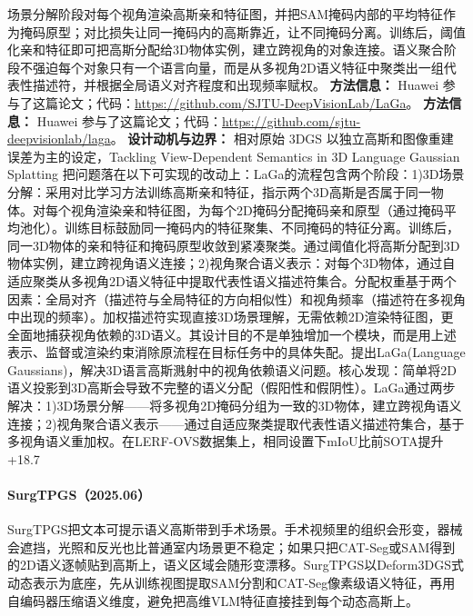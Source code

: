 场景分解阶段对每个视角渲染高斯亲和特征图，并把SAM掩码内部的平均特征作为掩码原型；对比损失让同一掩码内的高斯靠近，让不同掩码分离。训练后，阈值化亲和特征即可把高斯分配给3D物体实例，建立跨视角的对象连接。语义聚合阶段不强迫每个对象只有一个语言向量，而是从多视角2D语义特征中聚类出一组代表性描述符，并根据全局语义对齐程度和出现频率赋权。
\textbf{方法信息：} Huawei 参与了这篇论文；代码：\url{https://github.com/SJTU-DeepVisionLab/LaGa}。
\textbf{方法信息：} Huawei 参与了这篇论文；代码：\url{https://github.com/sjtu-deepvisionlab/laga}。
\textbf{设计动机与边界：} 相对原始 3DGS 以独立高斯和图像重建误差为主的设定，Tackling View-Dependent Semantics in 3D Language Gaussian Splatting 把问题落在以下可实现的改动上：LaGa的流程包含两个阶段：1)3D场景分解：采用对比学习方法训练高斯亲和特征，指示两个3D高斯是否属于同一物体。对每个视角渲染亲和特征图，为每个2D掩码分配掩码亲和原型（通过掩码平均池化）。训练目标鼓励同一掩码内的特征聚集、不同掩码的特征分离。训练后，同一3D物体的亲和特征和掩码原型收敛到紧凑聚类。通过阈值化将高斯分配到3D物体实例，建立跨视角语义连接；2)视角聚合语义表示：对每个3D物体，通过自适应聚类从多视角2D语义特征中提取代表性语义描述符集合。分配权重基于两个因素：全局对齐（描述符与全局特征的方向相似性）和视角频率（描述符在多视角中出现的频率）。加权描述符实现直接3D场景理解，无需依赖2D渲染特征图，更全面地捕获视角依赖的3D语义。其设计目的不是单独增加一个模块，而是用上述表示、监督或渲染约束消除原流程在目标任务中的具体失配。提出LaGa(Language Gaussians)，解决3D语言高斯溅射中的视角依赖语义问题。核心发现：简单将2D语义投影到3D高斯会导致不完整的语义分配（假阳性和假阴性）。LaGa通过两步解决：1)3D场景分解——将多视角2D掩码分组为一致的3D物体，建立跨视角语义连接；2)视角聚合语义表示——通过自适应聚类提取代表性语义描述符集合，基于多视角语义重加权。在LERF-OVS数据集上，相同设置下mIoU比前SOTA提升+18.7%
\paragraph{SurgTPGS（2025.06）\cite{2506_23309}}
SurgTPGS把文本可提示语义高斯带到手术场景。手术视频里的组织会形变，器械会遮挡，光照和反光也比普通室内场景更不稳定；如果只把CAT-Seg或SAM得到的2D语义逐帧贴到高斯上，语义区域会随形变漂移。SurgTPGS以Deform3DGS式动态表示为底座，先从训练视图提取SAM分割和CAT-Seg像素级语义特征，再用自编码器压缩语义维度，避免把高维VLM特征直接挂到每个动态高斯上。

